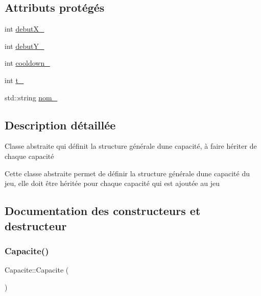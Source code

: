 \subsection*{Attributs protégés}
\begin{DoxyCompactItemize}
\item 
int \hyperlink{class_capacite_abc3eb04129009107c0b60b03e7a3ff06}{debut\+X\+\_\+}
\item 
int \hyperlink{class_capacite_a741d48934a015c226b15e6519724e400}{debut\+Y\+\_\+}
\item 
int \hyperlink{class_capacite_aabb946971871ffbcb9bb9a4d9cd3c0c3}{cooldown\+\_\+}
\item 
int \hyperlink{class_capacite_ac743cb7c9605c9e3205885cdcf14d2dd}{t\+\_\+}
\item 
std\+::string \hyperlink{class_capacite_a430472b509233086cbad1d6d8332dc8c}{nom\+\_\+}
\end{DoxyCompactItemize}


\subsection{Description détaillée}
Classe abstraite qui définit la structure générale d\textquotesingle{}une capacité, à faire hériter de chaque capacité 

Cette classe abstraite permet de définir la structure générale d\textquotesingle{}une capacité du jeu, elle doit être héritée pour chaque capacité qui est ajoutée au jeu 

\subsection{Documentation des constructeurs et destructeur}
\mbox{\label{class_capacite_a8a1aebc5b2332e366a3f207c23b4d363}} 
\subsubsection{\texorpdfstring{Capacite()}{Capacite()}}
{\footnotesize\ttfamily Capacite\+::\+Capacite (\begin{DoxyParamCaption}{ }\end{DoxyParamCaption})\hspace{0.3cm}{\ttfamily [default]}}

\mbox{\label{class_capacite_a687ff139afef118ebb63b897861674fd}} 
